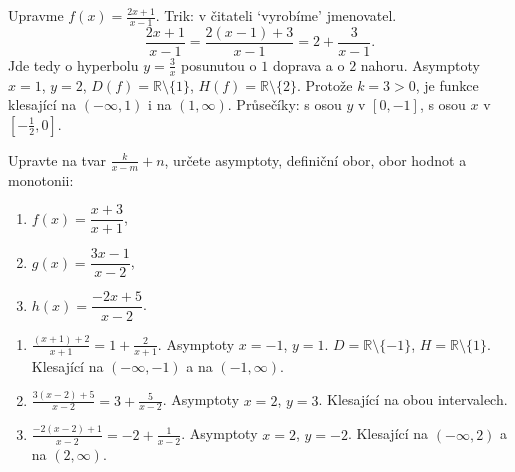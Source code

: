 \begin{example}
  Upravme $f(x) = \frac{2x + 1}{x - 1}$. Trik: v čitateli `vyrobíme' jmenovatel.
  \begin{equation*}
    \frac{2x + 1}{x - 1} = \frac{2(x - 1) + 3}{x - 1} = 2 + \frac{3}{x - 1}.
  \end{equation*}
  Jde tedy o hyperbolu $y = \frac{3}{x}$ posunutou o $1$ doprava a o $2$ nahoru. Asymptoty $x = 1$, $y = 2$, $D(f) = \mathbb{R}\setminus\{1\}$, $H(f) = \mathbb{R}\setminus\{2\}$. Protože $k = 3 > 0$, je funkce klesající na $(-\infty, 1)$ i na $(1, \infty)$. Průsečíky: s osou $y$ v $[0, -1]$, s osou $x$ v $\left[-\frac{1}{2}, 0\right]$.
  \begin{center}
  \end{center}
\end{example}

\begin{problem}
  Upravte na tvar $\frac{k}{x - m} + n$, určete asymptoty, definiční obor, obor hodnot a monotonii:
  \begin{enumerate}[label=(\alph*)]
    \item $f(x) = \dfrac{x + 3}{x + 1}$,
    \item $g(x) = \dfrac{3x - 1}{x - 2}$,
    \item $h(x) = \dfrac{-2x + 5}{x - 2}$.
  \end{enumerate}
\end{problem}

\begin{solution}
  \begin{enumerate}[label=(\alph*)]
    \item $\frac{(x + 1) + 2}{x + 1} = 1 + \frac{2}{x + 1}$. Asymptoty $x = -1$, $y = 1$. $D = \mathbb{R}\setminus\{-1\}$, $H = \mathbb{R}\setminus\{1\}$. Klesající na $(-\infty, -1)$ a na $(-1, \infty)$.
    \item $\frac{3(x - 2) + 5}{x - 2} = 3 + \frac{5}{x - 2}$. Asymptoty $x = 2$, $y = 3$. Klesající na obou intervalech.
    \item $\frac{-2(x - 2) + 1}{x - 2} = -2 + \frac{1}{x - 2}$. Asymptoty $x = 2$, $y = -2$. Klesající na $(-\infty, 2)$ a na $(2, \infty)$.
  \end{enumerate}
\end{solution}

